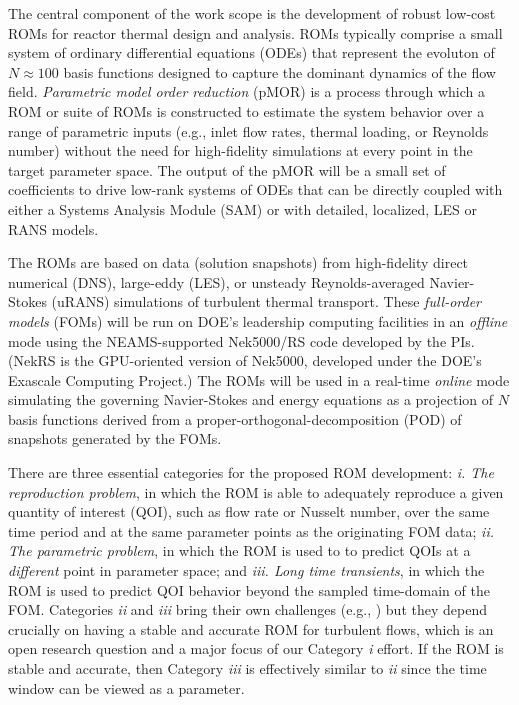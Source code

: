 
The central component of the work scope is the development of robust low-cost
ROMs for reactor thermal design and analysis.
ROMs typically comprise a small system of ordinary differential equations
(ODEs) that represent the evoluton of $N \approx 100$ basis functions designed
to capture the dominant dynamics of the flow field.
   {\em Parametric model order reduction} (pMOR) is a process through which
a ROM or suite of ROMs is constructed to estimate the system behavior 
over a range of parametric inputs (e.g., inlet flow rates, thermal loading,
or Reynolds number)
without the need for high-fidelity simulations at every point in the target
parameter space.  The output of the pMOR will be a small set of coefficients to
drive low-rank systems of ODEs that can be directly coupled with either a
Systems Analysis Module (SAM) or with detailed, localized, LES or RANS models.

The ROMs are based on data (solution snapshots) from high-fidelity direct
numerical (DNS), large-eddy (LES), or unsteady Reynolds-averaged Navier-Stokes
(uRANS) simulations of turbulent thermal transport.   These \textit{full-order
models} (FOMs) will be run on DOE's leadership computing facilities in an {\em
offline} mode using the NEAMS-supported Nek5000/RS code developed by the PIs.
(NekRS is the GPU-oriented version of Nek5000, developed under the DOE's
Exascale Computing Project.) The ROMs will be used in a real-time {\em online}
mode simulating the governing Navier-Stokes and energy equations as a
projection of $N$ basis functions derived from a
proper-orthogonal-decomposition (POD) of snapshots generated by the FOMs.

There are three essential categories for the proposed ROM development:
\textit{i. The reproduction problem}, in which the ROM is able to
adequately reproduce a given quantity of interest (QOI), such as
flow rate or Nusselt number, over the same time period and at the
same parameter points as the originating FOM data;
\textit{ii. The parametric problem}, in which the ROM is used to
to predict QOIs at a {\em different} point in parameter space;
and
\textit{iii. Long time transients}, in which the ROM is used to
predict QOI behavior beyond the sampled time-domain of the FOM.
Categories \textit{ii} and \textit{iii} bring their own challenges
(e.g., \cite{tsai22a}) but they depend crucially on having a 
stable and accurate ROM for turbulent flows, which is an open
research question and a major focus of our Category \textit{i} effort.
If the ROM is stable and accurate, then Category \textit{iii} is 
effectively similar to \textit{ii} since the time window can be
viewed as a parameter.

